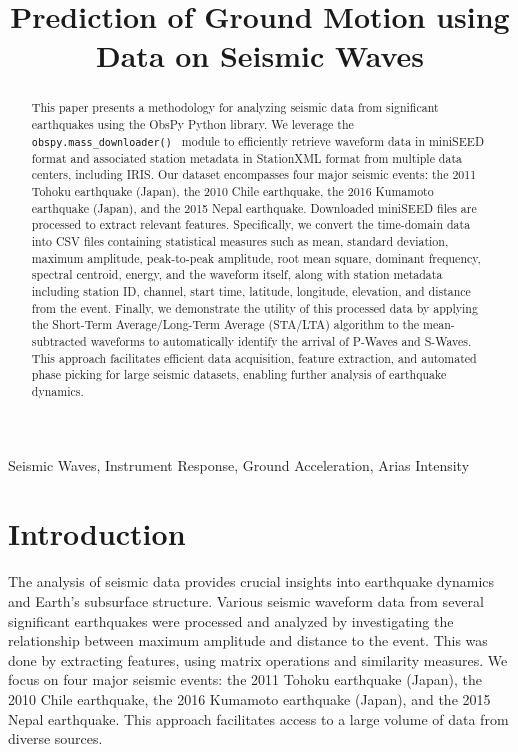 \documentclass[conference]{IEEEtran}
\date{}
\title{Prediction of Ground Motion using Data on Seismic Waves}
\begin{document}
\maketitle
\begin{abstract}
This paper presents a methodology for analyzing seismic data from significant
earthquakes using the ObsPy Python library. We leverage the
\texttt{obspy.mass\_downloader() } module to efficiently retrieve waveform data
in miniSEED format and associated station metadata in StationXML format from
multiple data centers, including IRIS. Our dataset encompasses four major
seismic events: the 2011 Tohoku earthquake (Japan), the 2010 Chile earthquake,
the 2016 Kumamoto earthquake (Japan), and the 2015 Nepal earthquake. Downloaded
miniSEED files are processed to extract relevant features. Specifically, we
convert the time-domain data into CSV files containing statistical measures such
as mean, standard deviation, maximum amplitude, peak-to-peak amplitude, root
mean square, dominant frequency, spectral centroid, energy, and the waveform
itself, along with station metadata including station ID, channel, start time,
latitude, longitude, elevation, and distance from the event. Finally, we
demonstrate the utility of this processed data by applying the Short-Term
Average/Long-Term Average (STA/LTA) algorithm to the mean-subtracted waveforms
to automatically identify the arrival of P-Waves and S-Waves. This approach facilitates
efficient data acquisition, feature extraction, and automated phase picking for
large seismic datasets, enabling further analysis of earthquake dynamics.
\end{abstract}


\begin{IEEEkeywords}

Seismic Waves, Instrument Response, Ground Acceleration, Arias Intensity

\end{IEEEkeywords}
\section{Introduction}
\label{sec:org602ef39}
The analysis of seismic data provides crucial insights into earthquake dynamics
and Earth's subsurface structure. Various seismic waveform data from several
significant earthquakes were processed and analyzed by investigating the
relationship between maximum amplitude and distance to the event. This was done
by extracting features, using matrix operations and similarity measures. We
focus on four major seismic events: the 2011 Tohoku earthquake (Japan), the 2010
Chile earthquake, the 2016 Kumamoto earthquake (Japan), and the 2015 Nepal
earthquake. This approach facilitates access to a large volume of data from
diverse sources.
\end{document}
